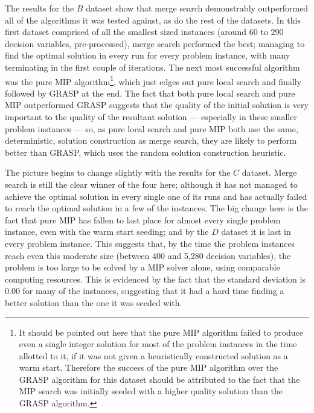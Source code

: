 \documentclass[authoryear,11pt,square,number,times,super,comma]{elsarticle}
\begin{document}
The results for the \(B\) dataset show that merge search demonstrably outperformed all of the algorithms it was tested against, as do the rest of the datasets. In this first dataset comprised of all the smallest sized instances (around 60 to 290 decision variables, pre-processed), merge search performed the best; managing to find the optimal solution in every run for every problem instance, with many terminating in the first couple of iterations. The next most successful algorithm was the pure MIP algorithm\footnote{It should be pointed out here that the pure MIP algorithm failed to produce even a single integer solution for most of the problem instances in the time allotted to it, if it was not given a heuristically constructed solution as a warm start. Therefore the success of the pure MIP algorithm over the GRASP algorithm for this dataset should be attributed to the fact that the MIP search was initially seeded with a higher quality solution than the GRASP algorithm.}, which just edges out pure local search and finally followed by GRASP at the end. The fact that both pure local search and pure MIP outperformed GRASP suggests that the quality of the initial solution is very important to the quality of the resultant solution --- especially in these smaller problem instances --- so, as pure local search and pure MIP both use the same, deterministic, solution construction as merge search, they are likely to perform better than GRASP, which uses the random solution construction heuristic.


The picture begins to change slightly with the results for the \(C\) dataset. Merge search is still the clear winner of the four here; although it has not managed to achieve the optimal solution in every single one of its runs and has actually failed to reach the optimal solution in a few of the instances. The big change here is the fact that pure MIP has fallen to last place for almost every single problem instance, even with the warm start seeding; and by the \(D\) dataset it is last in every problem instance. This suggests that, by the time the problem instances reach even this moderate size (between 400 and 5,280 decision variables), the problem is too large to be solved by a MIP solver alone, using comparable computing resources. This is evidenced by the fact that the standard deviation is 0.00 for many of the instances, suggesting that it had a hard time finding a better solution than the one it was seeded with. 
\end{document}

